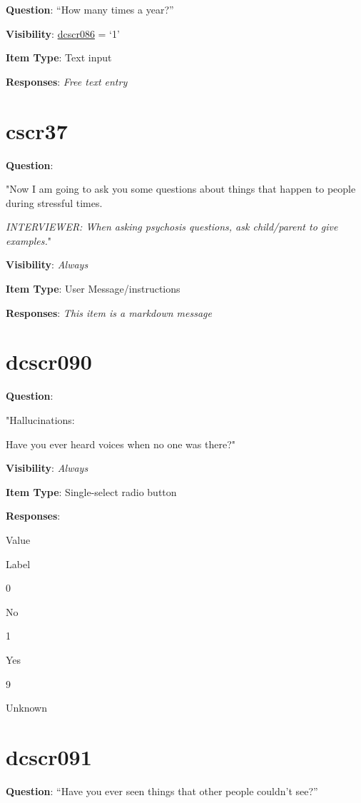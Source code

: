 \documentclass[]{book}
\begin{document}
\textbf{Question}: ``How many times a year?''

\textbf{Visibility}: \protect\hyperlink{dcscr086}{dcscr086} = `1'

\textbf{Item Type}: Text input

\textbf{Responses}: \emph{Free text entry}

\hypertarget{cscr37}{%
\section{cscr37}\label{cscr37}}

\textbf{Question}:

"Now I am going to ask you some questions about things that happen to people during stressful times.

\emph{INTERVIEWER: When asking psychosis questions, ask child/parent to give examples.}"

\textbf{Visibility}: \emph{Always}

\textbf{Item Type}: User Message/instructions

\textbf{Responses}: \emph{This item is a markdown message}

\hypertarget{dcscr090}{%
\section{dcscr090}\label{dcscr090}}

\textbf{Question}:

"Hallucinations:

Have you ever heard voices when no one was there?"

\textbf{Visibility}: \emph{Always}

\textbf{Item Type}: Single-select radio button

\textbf{Responses}:

Value

Label

0

No

1

Yes

9

Unknown

\hypertarget{dcscr091}{%
\section{dcscr091}\label{dcscr091}}

\textbf{Question}: ``Have you ever seen things that other people couldn't see?''
\end{document}
